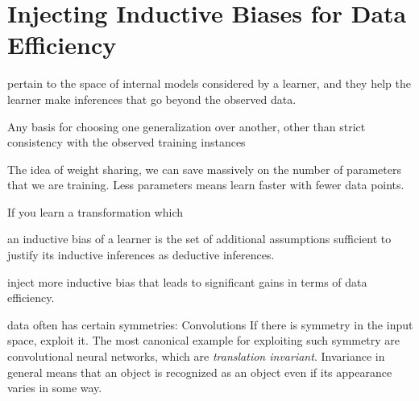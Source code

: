 \part{Injecting Inductive Biases for Data Efficiency}
\label{part3}
pertain to the space of internal models considered by a learner, and they help the learner make inferences
that go beyond the observed data.

Any basis for choosing one generalization
over another, other than strict consistency with the
observed training instances 


The idea of weight sharing, we can save massively on the number of parameters that we are training. Less parameters means learn faster with fewer data points. 

If you learn a transformation which 


an inductive bias of a learner is the set of additional assumptions sufficient to justify its inductive inferences as deductive inferences.


 inject more inductive bias that leads to significant gains in terms of data efficiency.
 
 
 data often has certain symmetries: Convolutions
If there is symmetry in the input space, exploit it.
The most canonical example for exploiting such symmetry are convolutional neural networks, which are \emph{translation invariant}. Invariance in general means that an object is recognized as an object even if its appearance varies in some way. 



